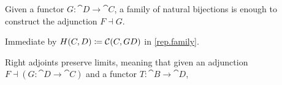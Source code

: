 
\begin{proposition}
Given a functor $G: \cat D \to \cat C$, a family of natural bijections
is enough to construct the adjunction $F \dashv G$.
\end{proposition}

\begin{strdproof}
Immediate by $H(C,D) \coloneqq \mathcal{C}(C,GD)$ in \cref{rep.family}.
\end{strdproof}

\begin{proposition}[RAPL]
Right adjoints preserve limits, meaning that given an adjunction %
$F \dashv (G : \cat D \to \cat C)$ and a functor $T : \cat B \to \cat D$,
\end{proposition}

